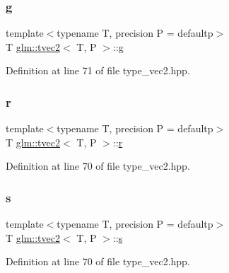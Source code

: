 \mbox{\label{structglm_1_1tvec2_ade1907a682b74b6c095d1c2847b21e76}} 
\subsubsection{\texorpdfstring{g}{g}}
{\footnotesize\ttfamily template$<$typename T, precision P = defaultp$>$ \\
T \mbox{\hyperlink{structglm_1_1tvec2}{glm\+::tvec2}}$<$ T, P $>$\+::\mbox{\hyperlink{glad_8h_a9cd653b1648845554169fbc3a3f6d37a}{g}}}



Definition at line 71 of file type\+\_\+vec2.\+hpp.

\mbox{\label{structglm_1_1tvec2_a1db700bfde11a9965a87c1e38c6f9fd6}} 
\subsubsection{\texorpdfstring{r}{r}}
{\footnotesize\ttfamily template$<$typename T, precision P = defaultp$>$ \\
T \mbox{\hyperlink{structglm_1_1tvec2}{glm\+::tvec2}}$<$ T, P $>$\+::\mbox{\hyperlink{glad_8h_abe08814c2f72843fde4d8df41440d5a0}{r}}}



Definition at line 70 of file type\+\_\+vec2.\+hpp.

\mbox{\label{structglm_1_1tvec2_abcad627ae6f435ce24b821f20bf4b3b3}} 
\subsubsection{\texorpdfstring{s}{s}}
{\footnotesize\ttfamily template$<$typename T, precision P = defaultp$>$ \\
T \mbox{\hyperlink{structglm_1_1tvec2}{glm\+::tvec2}}$<$ T, P $>$\+::\mbox{\hyperlink{glad_8h_af1b1d5edfea6a34daee7389b1b5810ad}{s}}}



Definition at line 70 of file type\+\_\+vec2.\+hpp.

